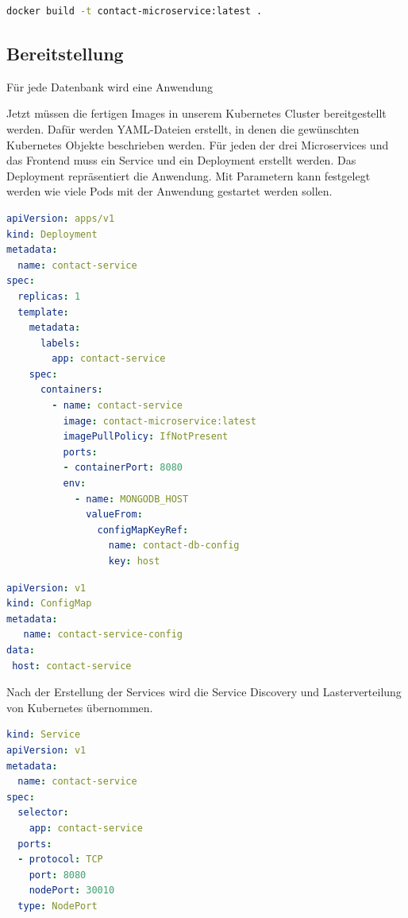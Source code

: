 \begin{lstlisting}[language=bash, caption=Befehl , captionpos=b]
docker build -t contact-microservice:latest .
\end{lstlisting}


\subsection{Bereitstellung}

Für jede Datenbank wird eine Anwendung 

Jetzt müssen die fertigen Images in unserem Kubernetes Cluster bereitgestellt werden. Dafür werden YAML-Dateien erstellt, in denen die gewünschten Kubernetes Objekte beschrieben werden. Für jeden der drei Microservices und das Frontend muss ein Service und ein Deployment erstellt werden. Das Deployment repräsentiert die Anwendung. Mit Parametern kann festgelegt werden wie viele Pods mit der Anwendung gestartet werden sollen.

\begin{lstlisting}[language=YAML, caption=Befehl]
apiVersion: apps/v1
kind: Deployment
metadata:
  name: contact-service
spec:
  replicas: 1
  template:
    metadata:
      labels:
        app: contact-service
    spec:
      containers:
        - name: contact-service
          image: contact-microservice:latest
          imagePullPolicy: IfNotPresent
          ports:
          - containerPort: 8080
          env:
            - name: MONGODB_HOST
              valueFrom:
                configMapKeyRef:
                  name: contact-db-config  
                  key: host
\end{lstlisting}

\begin{lstlisting}[language=YAML, morekeywords=host, caption=Befehl , captionpos=b]
apiVersion: v1
kind: ConfigMap
metadata:
   name: contact-service-config
data:
 host: contact-service
\end{lstlisting}

Nach der Erstellung der Services wird die Service Discovery und Lasterverteilung von Kubernetes übernommen. 

\begin{lstlisting}[language=YAML, caption=Befehl , captionpos=b]
kind: Service
apiVersion: v1
metadata:
  name: contact-service
spec:
  selector:
    app: contact-service
  ports:
  - protocol: TCP
    port: 8080
    nodePort: 30010
  type: NodePort
\end{lstlisting}

